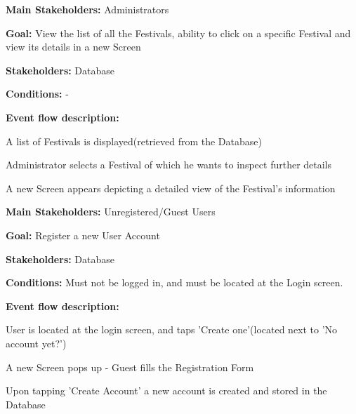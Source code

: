 				\noindent {}
				\begin{packed_item}
					\item \textbf{Main Stakeholders:} Administrators
					\item \textbf{Goal:} View the list of all the Festivals, ability to click on a specific Festival and view its details in a new Screen
					\item \textbf{Stakeholders:} Database
					\item \textbf{Conditions:} -
					\item \textbf{Event flow description: }
					\begin{packed_enum}
						\item A list of Festivals is displayed(retrieved from the Database)
						\item Administrator selects a Festival of which he wants to inspect further details
						\item A new Screen appears depicting a detailed view of the Festival's information
					\end{packed_enum}
				\end{packed_item}
					
				\noindent \underbar{\textbf{UC2 - Registration}}
				\begin{packed_item}
					\item \textbf{Main Stakeholders:} Unregistered/Guest Users
					\item \textbf{Goal:} Register a new User Account
					\item \textbf{Stakeholders:} Database
					\item \textbf{Conditions:} Must not be logged in, and must be located at the Login screen.
					\item \textbf{Event flow description: }
					\begin{packed_enum}
						\item User is located at the login screen, and taps 'Create one'(located next to 'No account yet?')
						\item A new Screen pops up - Guest fills the Registration Form
						\item Upon tapping 'Create Account' a new account is created and stored in the Database
					\end{packed_enum}
				\end{packed_item}
			
